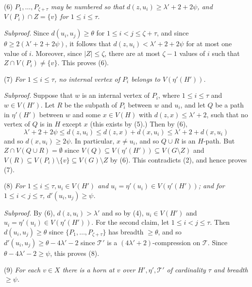 \hspace*{12pt}(6) \textit{$P_1, \dots, P_{\zeta+\tau}$ may be numbered so that $d(z, u_i) \ge \lambda' + 2 + 2\psi$, and $V(P_i) \cap Z = \{v\}$ for $1 \le i \le \tau$.}

\textit{Subproof.} Since $d(u_i, u_j) \ge \theta$ for $1 \le i < j \le \zeta + \tau$, and since $\theta \ge 2(\lambda' + 2 + 2\psi)$, it follows that $d(z, u_i) < \lambda' + 2 + 2\psi$ for at most one value of $i$. Moreover, since $|Z| \le \zeta$, there are at most $\zeta - 1$ values of $i$ such that $Z \cap V(P_i) \ne \{v\}$. This proves (6).

\hspace*{12pt}(7) \textit{For $1 \le i \le \tau$, no internal vertex of $P_i$ belongs to $V(\eta'(H'))$.}

\textit{Subproof.} Suppose that $w$ is an internal vertex of $P_i$, where $1 \le i \le \tau$ and $w \in V(H')$. Let $R$ be the subpath of $P_i$ between $w$ and $u_i$, and let $Q$ be a path in $\eta'(H')$ between $w$ and some $x \in V(H)$ with $d(z, x) \le \lambda' + 2$, such that no vertex of $Q$ is in $H$ except $x$ (this exists by (5).) Then by (6),
\begin{equation*}
\lambda' + 2 + 2\psi \le d(z, u_i) \le d(z, x) + d(x, u_i) \le \lambda' + 2 + d(x, u_i)
\end{equation*}
and so $d(x, u_i) \ge 2\psi$. In particular, $x \ne u_i$, and so $Q \cup R$ is an $H$-path. But $Z \cap V(Q \cup R) = \emptyset$ since $V(Q) \subseteq V(\eta'(H')) \subseteq V(G \setminus Z)$ and $V(R) \subseteq V(P_i) \setminus \{v\} \subseteq V(G) \setminus Z$ by (6). This contradicts (2), and hence proves (7).

\hspace*{12pt}(8) \textit{For $1 \le i \le \tau, u_i \in V(H')$ and $u_i = \eta'(u_i) \in V(\eta'(H'))$; and for $1 \le i < j \le \tau$, $d'(u_i, u_j) \ge \psi$.}

\textit{Subproof.} By (6), $d(z, u_i) > \lambda'$ and so by (4), $u_i \in V(H')$ and $u_i = \eta'(u_i) \in V(\eta'(H'))$. For the second claim, let $1 \le i < j \le \tau$. Then $d(u_i, u_j) \ge \theta$ since $\{P_1, \dots, P_{\zeta+\tau}\}$ has breadth $\ge \theta$, and so $d'(u_i, u_j) \ge \theta - 4\lambda' - 2$ since $\mathscr{T}'$ is a $(4\lambda' + 2)$-compression on $\mathscr{T}$. Since $\theta - 4\lambda' - 2 \ge \psi$, this proves (8).

\hspace*{12pt}(9) \textit{For each $v \in X$ there is a horn at $v$ over $H', \eta', \mathscr{T}'$ of cardinality $\tau$ and breadth $\ge \psi$.}

